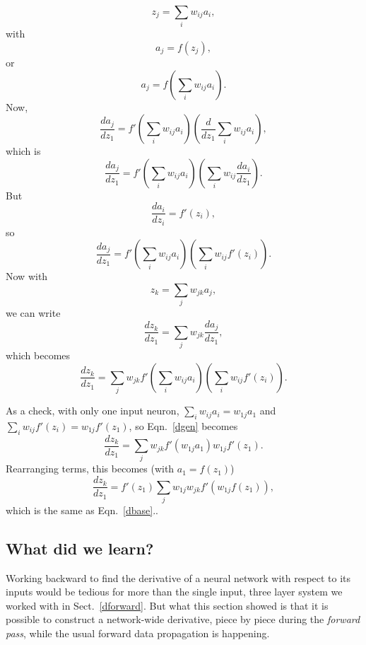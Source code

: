 \documentclass[12pt]{article}
\begin{document}
\begin{equation}
z_j=\sum_i w_{ij}a_i,
\end{equation}
with
\begin{equation}
a_j=f(z_j),
\end{equation}
or
\begin{equation}
a_j=f\left(\sum_i w_{ij}a_i\right).
\end{equation}
Now,
\begin{equation}
\frac{da_j}{dz_1}=f'\left(\sum_i w_{ij}a_i\right)\left(\frac{d}{dz_1}\sum_i w_{ij}a_i\right),
\end{equation}
which is
\begin{equation}
\frac{da_j}{dz_1}=f'\left(\sum_i w_{ij}a_i\right)\left(\sum_i w_{ij}\frac{da_i}{dz_1}\right).
\end{equation}
But
\begin{equation}
\frac{da_i}{dz_i}=f'(z_i),
\end{equation}
so
\begin{equation}
\label{dcore1}
\frac{da_j}{dz_1}=f'\left(\sum_i w_{ij}a_i\right)\left(\sum_i w_{ij}f'(z_i)\right).
\end{equation}
Now with
\begin{equation}
z_k=\sum_j w_{jk} a_j,
\end{equation}
we can write
\begin{equation}
\frac{dz_k}{dz_1}=\sum_j w_{jk}\frac{da_j}{dz_1},
\end{equation}
which becomes
\begin{equation}
\label{dgen}
\frac{dz_k}{dz_1}=\sum_j w_{jk}f'\left(\sum_i w_{ij}a_i\right)\left(\sum_i w_{ij}f'(z_i)\right).
\end{equation}

As a check, with only one input neuron, $\sum_i w_{ij}a_i=w_{1j}a_1$ and $\sum_i w_{ij}f'(z_i)=w_{1j}f'(z_1)$,
so Eqn.~\ref{dgen} becomes
\begin{equation}
\frac{dz_k}{dz_1}=\sum_j w_{jk}f'(w_{1j}a_1)w_{1j}f'(z_1).
\end{equation}
Rearranging terms, this becomes (with $a_1=f(z_1)$)
\begin{equation}
\frac{dz_k}{dz_1}=f'(z_1)\sum_j w_{1j} w_{jk}f'(w_{1j}f(z_1)),
\end{equation}
which is the same as Eqn.~\ref{dbase}..



\subsection{What did we learn?}
Working backward to find the derivative of a neural network with respect to its inputs would be tedious for more than the single input, three layer system we worked with in Sect.~\ref{dforward}. But what this section showed is that it is possible to construct a network-wide derivative, piece by piece during the {\sl forward pass}, while the usual forward data propagation is happening. 
\end{document}
